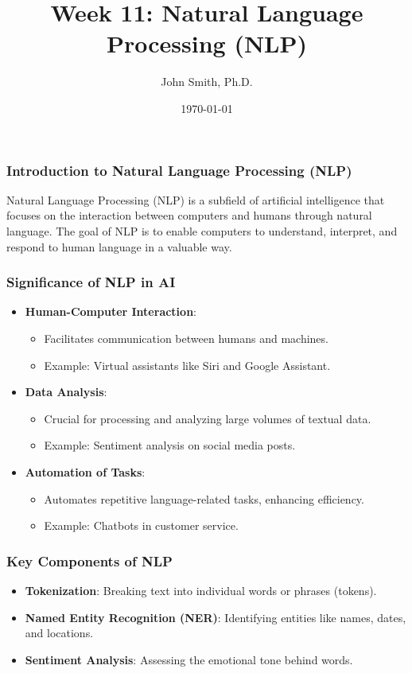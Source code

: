 \documentclass[aspectratio=169]{beamer}
\title[Week 11: NLP]{Week 11: Natural Language Processing (NLP)}
\author[J. Smith]{John Smith, Ph.D.}
\institute[University Name]{
  Department of Computer Science\\
  University Name\\
  \vspace{0.3cm}
  Email: email@university.edu\\
  Website: www.university.edu
}
\date{\today}
\begin{document}
\frame{\titlepage}

\begin{frame}[fragile]
    \frametitle{Introduction to Natural Language Processing (NLP)}
    Natural Language Processing (NLP) is a subfield of artificial intelligence that focuses on the interaction between computers and humans through natural language. The goal of NLP is to enable computers to understand, interpret, and respond to human language in a valuable way.
\end{frame}

\begin{frame}[fragile]
    \frametitle{Significance of NLP in AI}
    \begin{itemize}
        \item \textbf{Human-Computer Interaction}: 
        \begin{itemize}
            \item Facilitates communication between humans and machines.
            \item Example: Virtual assistants like Siri and Google Assistant.
        \end{itemize}
        
        \item \textbf{Data Analysis}:
        \begin{itemize}
            \item Crucial for processing and analyzing large volumes of textual data.
            \item Example: Sentiment analysis on social media posts.
        \end{itemize}

        \item \textbf{Automation of Tasks}: 
        \begin{itemize}
            \item Automates repetitive language-related tasks, enhancing efficiency.
            \item Example: Chatbots in customer service.
        \end{itemize}
    \end{itemize}
\end{frame}

\begin{frame}[fragile]
    \frametitle{Key Components of NLP}
    \begin{itemize}
        \item \textbf{Tokenization}: Breaking text into individual words or phrases (tokens).
        \item \textbf{Named Entity Recognition (NER)}: Identifying entities like names, dates, and locations.
        \item \textbf{Sentiment Analysis}: Assessing the emotional tone behind words.
    \end{itemize}
\end{frame}
\end{document}
